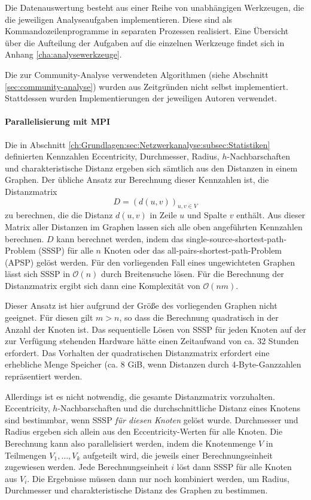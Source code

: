 Die Datenauswertung besteht aus einer Reihe von unabhängigen
Werkzeugen, die die jeweiligen Analyseaufgaben implementieren. Diese
sind als Kommandozeilenprogramme in separaten Prozessen
realisiert. Eine Übersicht über die Aufteilung der Aufgaben auf
die einzelnen Werkzeuge findet sich in Anhang
\ref{cha:analysewerkzeuge}.

Die zur Community-Analyse verwendeten Algorithmen (siehe Abschnitt
\ref{sec:community-analyse}) wurden aus Zeitgründen nicht selbst
implementiert. Stattdessen wurden Implementierungen der jeweiligen
Autoren verwendet.

\paragraph{Parallelisierung mit MPI}
\label{sec:parall-mitt-mpi}

Die in Abschnitt
\ref{ch:Grundlagen:sec:Netzwerkanalyse:subsec:Statistiken} definierten
Kennzahlen Eccentricity, Durchmesser, Radius, $h$-Nachbarschaften und
charakteristische Distanz ergeben sich sämtlich aus den Distanzen in
einem Graphen. Der übliche Ansatz zur Berechnung dieser Kennzahlen
ist, die Distanzmatrix
\begin{equation}
  \label{eq:7}
  D = (d(u, v))_{u, v\in V}
\end{equation}
zu berechnen, die die Distanz $d(u, v)$ in Zeile $u$ und Spalte $v$
enthält\cite{Brinkmeier2004}. Aus dieser Matrix aller Distanzen im
Graphen lassen sich alle oben angeführten Kennzahlen berechnen. $D$
kann berechnet werden, indem das single-source-shortest-path-Problem
(SSSP) für alle $n$ Knoten oder das all-pairs-shortest-path-Problem
(APSP) gelöst werden. Für den vorliegenden Fall eines
ungewichteten Graphen lässt sich SSSP in $\mathcal{O}(n)$ durch
Breitensuche lösen. Für die Berechnung der Distanzmatrix ergibt
sich dann eine Komplexität von $\mathcal{O}(nm)$.

Dieser Ansatz ist hier aufgrund der Größe des vorliegenden Graphen
nicht geeignet. Für diesen gilt $m > n$, so dass die Berechnung
quadratisch in der Anzahl der Knoten ist. Das sequentielle Lösen von
SSSP für jeden Knoten auf der zur Verfügung stehenden Hardware
hätte einen Zeitaufwand von ca. 32 Stunden erfordert. Das Vorhalten
der quadratischen Distanzmatrix erfordert eine erhebliche Menge
Speicher (ca. 8 GiB, wenn Distanzen durch 4-Byte-Ganzzahlen
repräsentiert werden.

Allerdings ist es nicht notwendig, die gesamte Distanzmatrix
vorzuhalten. Eccentricity, $h$-Nachbarschaften und die
durchschnittliche Distanz eines Knotens sind bestimmbar, wenn SSSP
\emph{für diesen Knoten} gelöst wurde. Durchmesser und Radius
ergeben sich allein aus den Eccentricity-Werten für alle Knoten. Die
Berechnung kann also parallelisiert werden, indem die Knotenmenge $V$
in Teilmengen $V_1, \dots, V_k$ aufgeteilt wird, die jeweils einer
Berechnungseinheit zugewiesen werden. Jede Berechnungseinheit $i$
löst dann SSSP für alle Knoten aus $V_i$. Die Ergebnisse müssen
dann nur noch kombiniert werden, um Radius, Durchmesser und
charakteristische Distanz des Graphen zu bestimmen.

